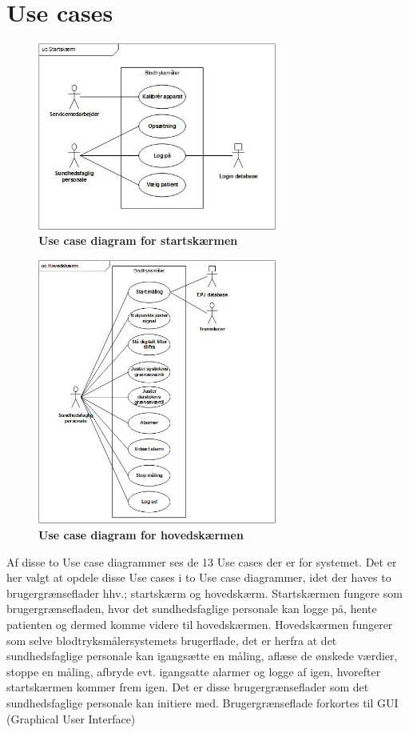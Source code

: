 \section{Use cases}
\begin{figure}[h!]
\includegraphics[width =0.7\textwidth , center]{billeder/UCStart}
\caption{\textbf{Use case diagram for startskærmen}}
\end{figure}
\begin{figure}[h!]
\includegraphics[width =0.7\textwidth , center]{billeder/UChoved}
\caption{\textbf{Use case diagram for hovedskærmen}}
\end{figure}
Af disse to Use case diagrammer ses de 13 Use cases der er for systemet. Det er her valgt at opdele disse Use cases i to Use case diagrammer, idet der haves to brugergrænseflader hhv.; startskærm og hovedskærm. Startskærmen fungere som brugergrænsefladen, hvor det sundhedsfaglige personale kan logge på, hente patienten og dermed komme videre til hovedskærmen. Hovedskærmen fungerer som selve blodtryksmålersystemets brugerflade, det er herfra at det sundhedsfaglige personale kan igangsætte en måling, aflæse de ønskede værdier, stoppe en måling, afbryde evt. igangsatte alarmer og logge af igen, hvorefter startskærmen kommer frem igen. Det er disse brugergrænseflader som det sundhedsfaglige personale kan initiere med. Brugergrænseflade forkortes til GUI (Graphical User Interface)\\
